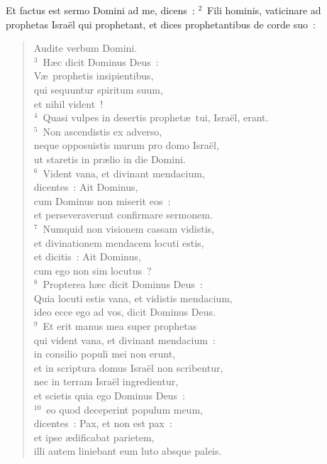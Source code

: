 \bchapter
\lettrine[lines=3,image=true,loversize=0.05,lraise=-0.03]{E}{}t factus est sermo Domini ad me, dicens~:
${}^{2}$~Fili hominis, vaticinare ad prophetas Isra\"el qui prophetant, et dices prophetantibus de corde suo~: \begin{flushleft}\begin{verse}Audite verbum Domini.\\
${}^{3}$~H\ae c dicit Dominus Deus~:\\ V\ae\ prophetis insipientibus,\\ qui sequuntur spiritum suum,\\ et nihil vident~!\\
${}^{4}$~Quasi vulpes in desertis prophet\ae\ tui, Isra\"el, erant.\\
${}^{5}$~Non ascendistis ex adverso,\\ neque opposuistis murum pro domo Isra\"el,\\ ut staretis in pr\ae lio in die Domini.\\
${}^{6}$~Vident vana, et divinant mendacium,\\ dicentes~: Ait Dominus,\\ cum Dominus non miserit eos~:\\ et perseveraverunt confirmare sermonem.\\
${}^{7}$~Numquid non visionem cassam vidistis,\\ et divinationem mendacem locuti estis,\\ et dicitis~: Ait Dominus,\\ cum ego non sim locutus~?\\
${}^{8}$~Propterea h\ae c dicit Dominus Deus~:\\ Quia locuti estis vana, et vidistis mendacium,\\ ideo ecce ego ad vos, dicit Dominus Deus.\\
${}^{9}$~Et erit manus mea super prophetas\\ qui vident vana, et divinant mendacium~:\\ in consilio populi mei non erunt,\\ et in scriptura domus Isra\"el non scribentur,\\ nec in terram Isra\"el ingredientur,\\ et scietis quia ego Dominus Deus~:\\
${}^{10}$~eo quod deceperint populum meum,\\ dicentes~: Pax, et non est pax~:\\ et ipse \ae dificabat parietem,\\ illi autem liniebant eum luto absque paleis.\\

\end{verse}
\end{flushleft}
